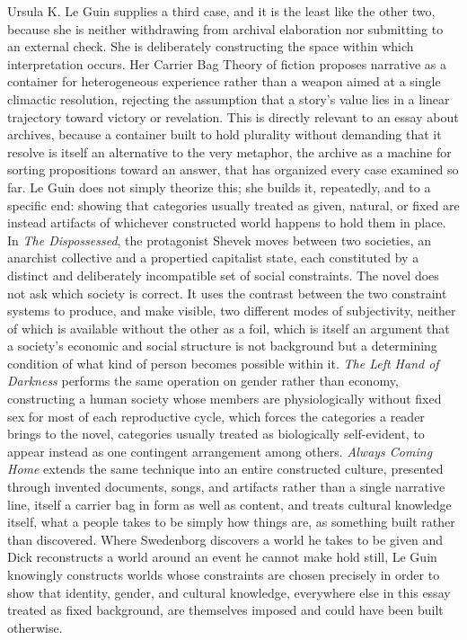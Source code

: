 \documentclass[11pt]{article}
\begin{document}
Ursula K. Le Guin supplies a third case, and it is the least like the other two, because she is neither withdrawing from archival elaboration nor submitting to an external check. She is deliberately constructing the space within which interpretation occurs. Her Carrier Bag Theory of fiction proposes narrative as a container for heterogeneous experience rather than a weapon aimed at a single climactic resolution, rejecting the assumption that a story's value lies in a linear trajectory toward victory or revelation. This is directly relevant to an essay about archives, because a container built to hold plurality without demanding that it resolve is itself an alternative to the very metaphor, the archive as a machine for sorting propositions toward an answer, that has organized every case examined so far. Le Guin does not simply theorize this; she builds it, repeatedly, and to a specific end: showing that categories usually treated as given, natural, or fixed are instead artifacts of whichever constructed world happens to hold them in place. In \emph{The Dispossessed}, the protagonist Shevek moves between two societies, an anarchist collective and a propertied capitalist state, each constituted by a distinct and deliberately incompatible set of social constraints. The novel does not ask which society is correct. It uses the contrast between the two constraint systems to produce, and make visible, two different modes of subjectivity, neither of which is available without the other as a foil, which is itself an argument that a society's economic and social structure is not background but a determining condition of what kind of person becomes possible within it. \emph{The Left Hand of Darkness} performs the same operation on gender rather than economy, constructing a human society whose members are physiologically without fixed sex for most of each reproductive cycle, which forces the categories a reader brings to the novel, categories usually treated as biologically self-evident, to appear instead as one contingent arrangement among others. \emph{Always Coming Home} extends the same technique into an entire constructed culture, presented through invented documents, songs, and artifacts rather than a single narrative line, itself a carrier bag in form as well as content, and treats cultural knowledge itself, what a people takes to be simply how things are, as something built rather than discovered. Where Swedenborg discovers a world he takes to be given and Dick reconstructs a world around an event he cannot make hold still, Le Guin knowingly constructs worlds whose constraints are chosen precisely in order to show that identity, gender, and cultural knowledge, everywhere else in this essay treated as fixed background, are themselves imposed and could have been built otherwise.
\end{document}
